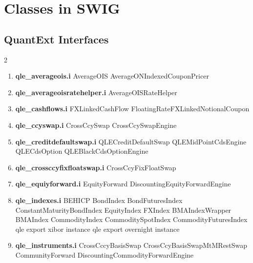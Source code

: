 \documentclass[10pt]{article}
\begin{document}
\pagebreak
\section*{Classes in SWIG}
\subsection*{QuantExt Interfaces}
\begin{multicols}{2}
    \begin{enumerate}
        \item \textbf{qle\_averageois.i}
                \subitem AverageOIS
                \subitem AverageONIndexedCouponPricer
        \item \textbf{qle\_averageoisratehelper.i}
                \subitem AverageOISRateHelper
        \item \textbf{qle\_cashflows.i}
                \subitem FXLinkedCashFlow
                \subitem FloatingRateFXLinkedNotionalCoupon
        \item \textbf{qle\_ccyswap.i}
                \subitem CrossCcySwap
                \subitem CrossCcySwapEngine
        \item \textbf{qle\_creditdefaultswap.i}
                \subitem QLECreditDefaultSwap
                \subitem QLEMidPointCdsEngine
                \subitem QLECdsOption
                \subitem QLEBlackCdsOptionEngine
        \item \textbf{qle\_crossccyfixfloatswap.i}
                \subitem CrossCcyFixFloatSwap
        \item \textbf{qle\_equiyforward.i}
                \subitem EquityForward
                \subitem DiscountingEquityForwardEngine
        \item \textbf{qle\_indexes.i}
                \subitem BEHICP
                \subitem BondIndex
                \subitem BondFuturesIndex
                \subitem ConstantMaturityBondIndex
                \subitem EquityIndex
                \subitem FXIndex
                \subitem BMAIndexWrapper
                \subitem BMAIndex
                \subitem CommodityIndex
                \subitem CommoditySpotIndex
                \subitem CommodityFuturesIndex
                \subitem qle export xibor instance
                \subitem qle export overnight instance
        \item \textbf{qle\_instruments.i}
                \subitem CrossCccyBasisSwap
                \subitem CrossCcyBasisSwapMtMRestSwap
                \subitem CommunityForward
                \subitem DiscountingCommodityForwardEngine

\end{enumerate}
\end{multicols}
\end{document}
